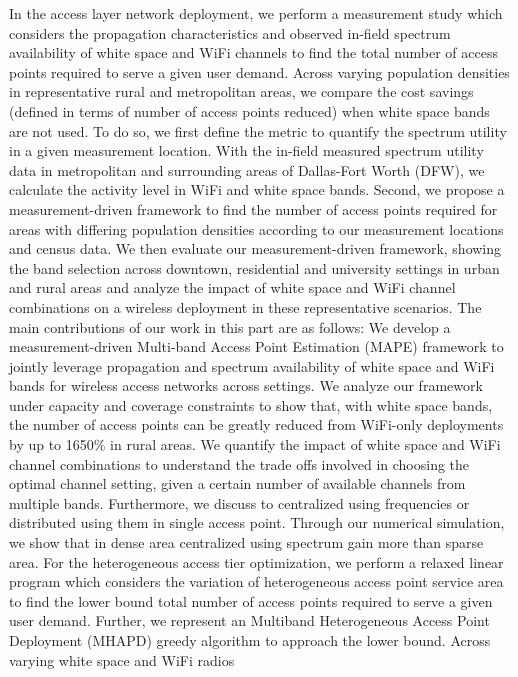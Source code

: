 In the access layer network deployment, 
we perform a measurement study 
which considers the propagation characteristics and observed in-field 
spectrum availability of white space and WiFi channels to find the total 
number of access points required to serve a given user demand. 
Across 
varying population densities in representative rural and metropolitan 
areas, we compare the cost savings (defined in terms of number of access 
points reduced) when white space bands are not used. To do so, we first 
define the metric to quantify the spectrum utility in a given measurement 
location. With the in-field measured spectrum utility data in metropolitan 
and surrounding areas of Dallas-Fort Worth (DFW), we calculate the 
activity level in WiFi and white space bands. Second, we propose a 
measurement-driven framework to find the number of access points required 
for areas with differing population densities according to our measurement 
locations and census data. We then evaluate our measurement-driven framework, 
showing the band selection across downtown, residential and university 
settings in urban and rural areas and analyze the impact of white space 
and WiFi channel combinations on a wireless deployment in these 
representative scenarios. 
The main contributions of our work in this part are as follows: 
We develop a measurement-driven Multi-band Access 
Point Estimation (MAPE) framework to jointly leverage propagation and 
spectrum availability of white space and WiFi bands for wireless access 
networks across settings. We analyze our framework under capacity and 
coverage constraints to show that, with white space bands, the number 
of access points can be greatly reduced from WiFi-only deployments by 
up to 1650\% in rural areas. We quantify the impact of white space and 
WiFi channel combinations to understand the trade offs involved in choosing 
the optimal channel setting, given a certain number of available channels 
from multiple bands. Furthermore, we discuss to centralized using frequencies 
or distributed using them in single access point. Through our numerical 
simulation, we show that in dense area centralized using spectrum gain 
more than sparse area.
For the heterogeneous access tier optimization, we perform a relaxed linear 
program which considers the variation of heterogeneous access point service 
area to find the lower bound total number of access points required to 
serve a given user demand. Further, we represent an Multiband Heterogeneous 
Access Point Deployment (MHAPD) greedy algorithm 
to approach the lower bound. Across varying white space and WiFi radios 

